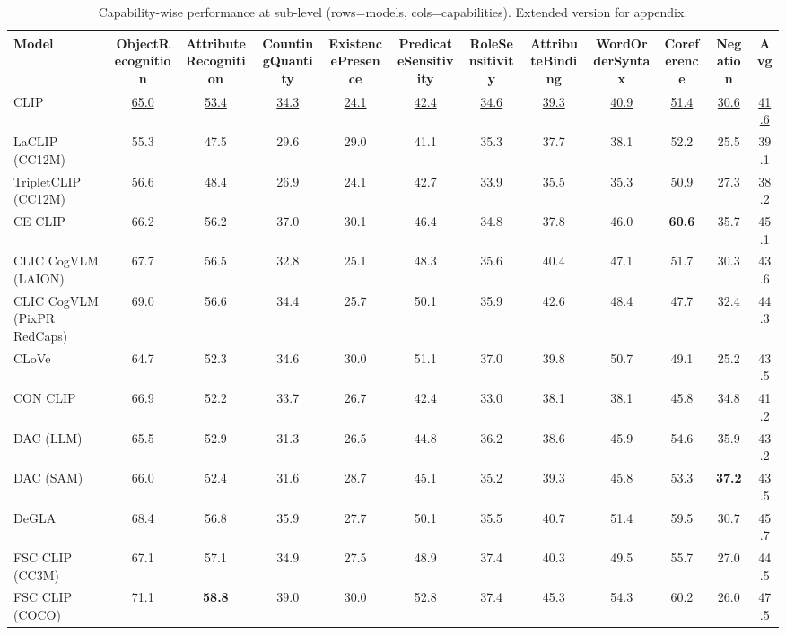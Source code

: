 \begin{table}[t]
  \centering
  \scriptsize
  \caption{Capability-wise performance at sub-level (rows=models, cols=capabilities). Extended version for appendix.}
  \label{tab:caps_sub}
  \begin{adjustbox}{max width=\textwidth}
  \setlength{\tabcolsep}{2pt}
  \begin{tabular}{p{5.0cm}ccccccccccc}
    \toprule
    Model & ObjectRecognition & AttributeRecognition & CountingQuantity & ExistencePresence & PredicateSensitivity & RoleSensitivity & AttributeBinding & WordOrderSyntax & Coreference & Negation & Avg \\
    \midrule
    CLIP & \underline{65.0} & \underline{53.4} & \underline{34.3} & \underline{24.1} & \underline{42.4} & \underline{34.6} & \underline{39.3} & \underline{40.9} & \underline{51.4} & \underline{30.6} & \underline{41.6} \\
    \midrule
    LaCLIP (CC12M) & 55.3 & 47.5 & 29.6 & 29.0 & 41.1 & 35.3 & 37.7 & 38.1 & 52.2 & 25.5 & 39.1 \\
    TripletCLIP (CC12M) & 56.6 & 48.4 & 26.9 & 24.1 & 42.7 & 33.9 & 35.5 & 35.3 & 50.9 & 27.3 & 38.2 \\
    \midrule
    CE CLIP & 66.2 & 56.2 & 37.0 & 30.1 & 46.4 & 34.8 & 37.8 & 46.0 & \textbf{60.6} & 35.7 & 45.1 \\
    CLIC CogVLM (LAION) & 67.7 & 56.5 & 32.8 & 25.1 & 48.3 & 35.6 & 40.4 & 47.1 & 51.7 & 30.3 & 43.6 \\
    CLIC CogVLM (PixPR RedCaps) & 69.0 & 56.6 & 34.4 & 25.7 & 50.1 & 35.9 & 42.6 & 48.4 & 47.7 & 32.4 & 44.3 \\
    CLoVe & 64.7 & 52.3 & 34.6 & 30.0 & 51.1 & 37.0 & 39.8 & 50.7 & 49.1 & 25.2 & 43.5 \\
    CON CLIP & 66.9 & 52.2 & 33.7 & 26.7 & 42.4 & 33.0 & 38.1 & 38.1 & 45.8 & 34.8 & 41.2 \\
    DAC (LLM) & 65.5 & 52.9 & 31.3 & 26.5 & 44.8 & 36.2 & 38.6 & 45.9 & 54.6 & 35.9 & 43.2 \\
    DAC (SAM) & 66.0 & 52.4 & 31.6 & 28.7 & 45.1 & 35.2 & 39.3 & 45.8 & 53.3 & \textbf{37.2} & 43.5 \\
    DeGLA & 68.4 & 56.8 & 35.9 & 27.7 & 50.1 & 35.5 & 40.7 & 51.4 & 59.5 & 30.7 & 45.7 \\
    FSC CLIP (CC3M) & 67.1 & 57.1 & 34.9 & 27.5 & 48.9 & 37.4 & 40.3 & 49.5 & 55.7 & 27.0 & 44.5 \\
    FSC CLIP (COCO) & 71.1 & \textbf{58.8} & 39.0 & 30.0 & 52.8 & 37.4 & 45.3 & 54.3 & 60.2 & 26.0 & 47.5 \\

\end{tabular}
\end{adjustbox}
\end{table}
